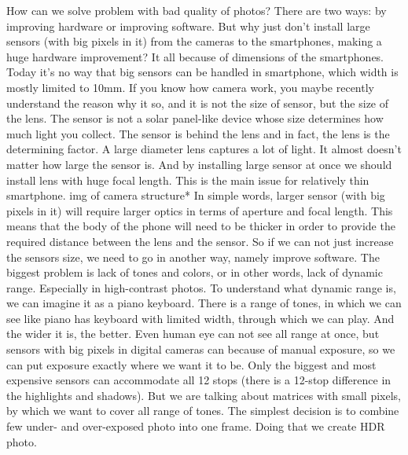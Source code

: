\documentclass[10pt,twoside,english,a4paper]{article}
\begin{document}
How can we solve problem with bad quality of photos? There are two ways:
by improving hardware or improving software. But why just don't install
large sensors (with big pixels in it) from the cameras to the smartphones, 
making a huge hardware improvement?
\newline It all because of dimensions of the smartphones. Today it's no
way that big sensors can be handled in smartphone, which width is mostly
limited to  10mm. If you know how camera work, you maybe recently
understand the reason why it so, and it is not the size of sensor, but the
size of the lens. The sensor is not a solar panel-like device whose size
determines how much light you collect. The sensor is behind the lens
and in fact, the lens is the determining factor.
A large diameter lens captures a lot of light.
It almost doesn't matter how large the sensor is. And by installing large
sensor at once we should install lens with huge focal length. This is the
main issue for relatively thin smartphone.
\newline *img of camera structure*
\newline In simple words, larger sensor (with big pixels in it) will require
larger optics in terms of aperture and focal length.
This means that the body of the phone will need to be thicker in
order to provide the required distance between the lens and the sensor.
\newline
So if we can not just increase the sensors size, we need to go in another
way, namely improve software. The biggest problem is lack of tones and
colors, or in other words, lack  of dynamic range. Especially in
high-contrast photos.
To understand what dynamic range is, we can imagine it as a piano keyboard. There is
a range of tones, in which we can see like piano has keyboard with limited
 width, through which we can play. And the wider
it is, the better. Even human eye can not see all range at once, but sensors 
with big pixels in
digital cameras can because of manual exposure, so we can put exposure
exactly where we want it to be. Only the biggest and most expensive
sensors can accommodate all 12 stops (there is a 12-stop difference in the
highlights and shadows). But we are talking about matrices with small
pixels, by which we want to cover all range of tones.
\newline The simplest decision is to combine few under- and over-exposed
photo into one frame. Doing that we create HDR photo.
\end{document}
